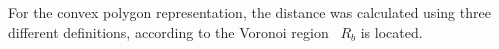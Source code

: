\documentclass[eprint]{actapoly}
\begin{document}
\begin{enumerate}
    For the convex polygon representation, the distance was calculated
    using three different
    definitions, according to the Voronoi region~\cite{ericson2004real}
    $R_b$ is located.
%
%
%    
%    
%    
%    
% 	
%    
%    
%	    

\end{enumerate}
\end{document}
